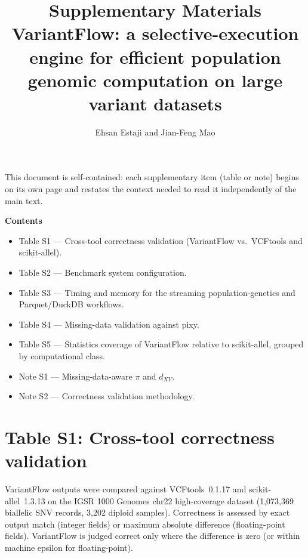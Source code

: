 \documentclass[11pt]{article}
\title{Supplementary Materials\\[2pt]
\large VariantFlow: a selective-execution engine for efficient population\\
genomic computation on large variant datasets}
\author{Ehsan Estaji and Jian-Feng Mao}
\date{}
\begin{document}
\maketitle

\noindent This document is self-contained: each supplementary item (table or
note) begins on its own page and restates the context needed to read it
independently of the main text.

\vspace{1em}
\noindent\textbf{Contents}
\begin{itemize}\itemsep2pt
  \item Table S1 --- Cross-tool correctness validation (VariantFlow vs.\ VCFtools and scikit-allel).
  \item Table S2 --- Benchmark system configuration.
  \item Table S3 --- Timing and memory for the streaming population-genetics and Parquet/DuckDB workflows.
  \item Table S4 --- Missing-data validation against pixy.
  \item Table S5 --- Statistics coverage of VariantFlow relative to scikit-allel, grouped by computational class.
  \item Note S1 --- Missing-data-aware $\pi$ and $d_{XY}$.
  \item Note S2 --- Correctness validation methodology.
\end{itemize}

\newpage
\section*{Table S1: Cross-tool correctness validation}

VariantFlow outputs were compared against VCFtools~0.1.17 and scikit-allel~1.3.13
on the IGSR 1000 Genomes chr22 high-coverage dataset (1,073,369 biallelic
SNV records, 3,202 diploid samples). Correctness is assessed by exact
output match (integer fields) or maximum absolute difference (floating-point
fields). VariantFlow is judged correct only where the difference is zero (or
within machine epsilon for floating-point).
\end{document}

